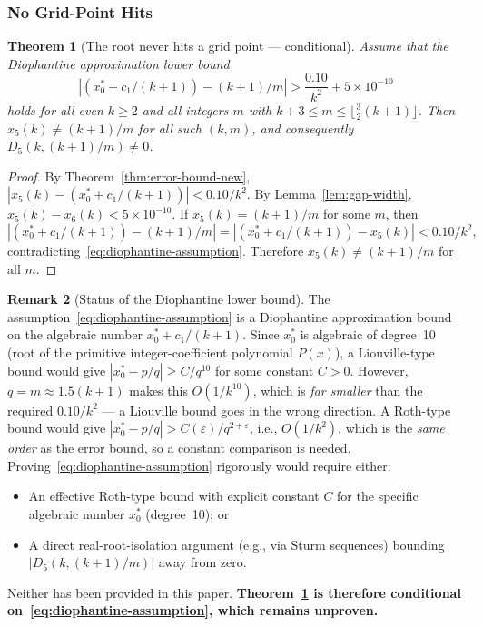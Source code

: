 \documentclass[12pt,a4paper]{article}
\theoremstyle{plain}
\newtheorem{theorem}{Theorem}[section]
\theoremstyle{definition}
\newtheorem{remark}[theorem]{Remark}
\begin{document}
\subsubsection{No Grid-Point Hits}
\label{sec:no-hits}

\begin{theorem}[The root never hits a grid point --- conditional]
  \label{thm:no-hits}
  Assume that the Diophantine approximation lower bound
  \begin{equation}\label{eq:diophantine-assumption}
    |(x_0^* + c_1/(k+1)) - (k+1)/m|
    > \frac{0.10}{k^2} + 5 \times 10^{-10}
  \end{equation}
  holds for all even $k \ge 2$ and all integers $m$ with
  $k+3 \le m \le \lfloor\frac{3}{2}(k+1)\rfloor$.
  Then $x_5(k) \neq (k+1)/m$ for all such $(k,m)$, and consequently
  $D_5(k, (k+1)/m) \neq 0$.
\end{theorem}

\begin{proof}
  By Theorem~\ref{thm:error-bound-new},
  $|x_5(k) - (x_0^* + c_1/(k+1))| < 0.10/k^2$.
  By Lemma~\ref{lem:gap-width}, $x_5(k) - x_6(k) < 5 \times 10^{-10}$.
  If $x_5(k) = (k+1)/m$ for some $m$, then
  \[
    |(x_0^* + c_1/(k+1)) - (k+1)/m|
    = |(x_0^* + c_1/(k+1)) - x_5(k)|
    < 0.10/k^2,
  \]
  contradicting~\eqref{eq:diophantine-assumption}.
  Therefore $x_5(k) \neq (k+1)/m$ for all $m$.
\end{proof}

\begin{remark}[Status of the Diophantine lower bound]
  \label{rem:diophantine-gap}
  The assumption~\eqref{eq:diophantine-assumption} is a Diophantine
  approximation bound on the algebraic number $x_0^* + c_1/(k+1)$.
  Since $x_0^*$ is algebraic of degree~10 (root of the primitive
  integer-coefficient polynomial $P(x)$), a Liouville-type bound would
  give $|x_0^* - p/q| \ge C/q^{10}$ for some constant $C > 0$.
  However, $q = m \approx 1.5(k+1)$ makes this $O(1/k^{10})$, which is
  \emph{far smaller} than the required $0.10/k^2$ --- a Liouville bound
  goes in the wrong direction.  A Roth-type bound would give
  $|x_0^* - p/q| > C(\varepsilon)/q^{2+\varepsilon}$, i.e., $O(1/k^2)$,
  which is the \emph{same order} as the error bound, so a constant
  comparison is needed.  Proving~\eqref{eq:diophantine-assumption}
  rigorously would require either:
  \begin{itemize}[nosep]
    \item An effective Roth-type bound with explicit constant $C$ for
      the specific algebraic number $x_0^*$ (degree~10); or
    \item A direct real-root-isolation argument (e.g., via Sturm
      sequences) bounding $|D_5(k,(k+1)/m)|$ away from zero.
  \end{itemize}
  Neither has been provided in this paper.  \textbf{Theorem~\ref{thm:no-hits}
  is therefore conditional on~\eqref{eq:diophantine-assumption}, which
  remains unproven.}
\end{remark}
\end{document}
